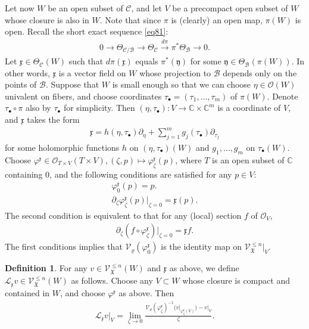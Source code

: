 \documentclass[12pt,a4paper,notitlepage]{report}
\theoremstyle{definition}
\newtheorem{df}{Definition}[section]
\theoremstyle{plain}
\newcommand{\fk}{\mathfrak}
\newcommand{\mc}{\mathcal}
\newcommand{\scr}{\mathscr}
\newcommand{\blt}{\bullet}
\newcommand{\Cbb}{\mathbb C}
\numberwithin{equation}{section}
\begin{document}
Let now $W$ be an open subset of $\mc C$, and let $V$ be a precompact open subset of $W$ whose closure is also in $W$. Note that since $\pi$ is (clearly) an open map, $\pi(W)$ is open. Recall the short exact sequence \eqref{eq81}:
\begin{align*}
0\rightarrow \Theta_{\mc C/\mc B}\rightarrow \Theta_{\mc C}\xrightarrow{d\pi}\pi^*\Theta_{\mc B}\rightarrow 0.
\end{align*}
Let $\fk x\in\Theta_{\mc C}(W)$ such that $d\pi(\fk x)$ equals $\pi^*(\fk y)$ for some $\fk y\in\Theta_{\mc B}(\pi(W))$. In other words, $\fk x$ is a vector field on $W$ whose projection to $\mc B$ depends only on the points of $\mc B$. Suppose that $W$ is small enough so that  we can choose $\eta\in\scr O(W)$ univalent on fibers, and choose coordinates  $\tau_\blt=(\tau_1,\dots,\tau_m)$ of $\pi(W)$. Denote $\tau_\blt\circ\pi$ also by $\tau_\blt$ for simplicity. Then $(\eta,\tau_\blt):V\rightarrow\Cbb\times\Cbb^m$ is a coordinate of $V$, and $\fk x$ takes the form
\begin{align}
\fk x=h(\eta,\tau_\blt)\partial_\eta+\sum_{j=1}^m g_j(\tau_\blt)\partial_{\tau_j}\label{eq85}
\end{align}
for some holomorphic functions $h$ on $(\eta,\tau_\blt)(W)$ and $g_1,\dots,g_m$ on $\tau_\blt(W)$.  Choose $\varphi^{\fk x}\in\scr O_{T\times V}(T\times V),(\zeta,p)\mapsto \varphi^{\fk x}_\zeta(p)$, where $T$ is an open subset of $\Cbb$ containing $0$, and  the following conditions are satisfied for any $p\in V$:
\begin{gather}
\varphi^{\fk x}_0(p)=p.\label{eq83}\\
\partial_\zeta\varphi^{\fk x}_\zeta(p)\big|_{\zeta=0}=\fk x(p).\label{eq84}
\end{gather}
The second condition is equivalent to that for any (local) section $f$ of $\scr O_V$,
\begin{gather}
\partial_\zeta (f\circ\varphi^{\fk x}_\zeta)\Big|_{\zeta=0}=\fk x f.\label{eq88}
\end{gather}
The first conditions implies that $\mc V_\varrho(\varphi^{\fk x}_0)$ is the identity map on $\scr V^{\leq n}_{\fk X}|_V$.


\begin{df}
For any $v\in\scr V_{\fk X}^{\leq n}(W)$ and $\fk x$ as above, we define $\mc L_{\fk x}v\in\scr V_{\fk X}^{\leq n}(W)$ as follows. Choose any $V\subset W$ whose closure is compact and contained in $W$,  and choose $\varphi^{\fk x}$ as above. Then
\begin{align}
\mc L_{\fk x}v\big|_V=\lim_{\zeta\rightarrow 0}\frac{\mc V_\varrho(\varphi^{\fk x}_\zeta)^{-1}\big(v\big|_{\varphi^{\fk x}_\zeta(V)}\big)-v\big|_V}{\zeta}.\label{eq89}
\end{align}
\end{df}
\end{document}
